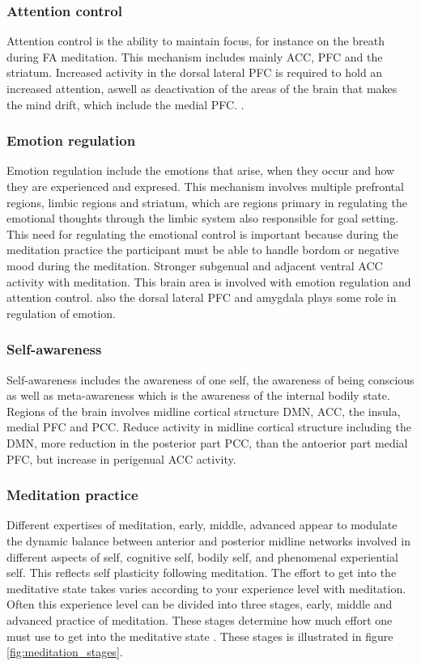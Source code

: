 \subsubsection{Attention control}
Attention control is the ability to maintain focus, for instance on the breath during FA meditation. This mechanism includes mainly ACC, PFC and the striatum. 
Increased activity in the dorsal lateral PFC is required to hold an increased attention, aswell as deactivation of the areas of the brain that makes the mind drift, which include the medial PFC. \cite{Tang2017}.

\subsubsection{Emotion regulation}
Emotion regulation include the emotions that arise, when they occur and how they are experienced and expresed. This mechanism involves multiple prefrontal regions, limbic regions and striatum, which are regions primary in regulating the emotional thoughts through the limbic system also responsible for goal setting. This need for regulating the emotional control is important because during the meditation practice the participant must be able to handle bordom or negative mood during the meditation. Stronger subgenual and adjacent ventral ACC activity with meditation. This brain area is involved with emotion regulation and attention control. also the dorsal lateral PFC and amygdala plays some role in regulation of emotion. 

\subsubsection{Self-awareness}
Self-awareness includes the awareness of one self, the awareness of being conscious as well as meta-awareness which is the awareness of the internal bodily state. Regions of the brain involves midline cortical structure DMN, ACC, the insula, medial PFC and PCC. Reduce activity in midline cortical structure including the DMN, more reduction in the posterior part PCC, than the antoerior part medial PFC, but increase in perigenual ACC activity.

\subsubsection{Meditation practice}
Different expertises of meditation, early, middle, advanced appear to modulate the dynamic balance between anterior and posterior midline networks involved in different aspects of self, cognitive self, bodily self, and phenomenal experiential self. This reflects self plasticity following meditation. 
The effort to get into the meditative state takes varies according to your experience level with meditation. Often this experience level can be divided into three stages, early, middle and advanced practice of meditation. These stages determine how much effort one must use to get into the meditative state \cite{Tang2017}. These stages is illustrated in figure \ref{fig:meditation_stages}.

